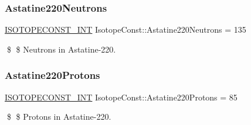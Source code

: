 \subsubsection{\texorpdfstring{Astatine220\+Neutrons}{Astatine220Neutrons}}
{\footnotesize\ttfamily \mbox{\hyperlink{group___isotope_const-_macros_ga5f18360b3e99483a35c32d789e62621c}{I\+S\+O\+T\+O\+P\+E\+C\+O\+N\+S\+T\+\_\+\+I\+NT}} Isotope\+Const\+::\+Astatine220\+Neutrons = 135}

\$ \$ Neutrons in Astatine-\/220. \mbox{\label{group___isotope_const-_astatine-_at220_gaec1e8ab21c4bf2a6cb58ed55bd0a7ad8}} 
\subsubsection{\texorpdfstring{Astatine220\+Protons}{Astatine220Protons}}
{\footnotesize\ttfamily \mbox{\hyperlink{group___isotope_const-_macros_ga5f18360b3e99483a35c32d789e62621c}{I\+S\+O\+T\+O\+P\+E\+C\+O\+N\+S\+T\+\_\+\+I\+NT}} Isotope\+Const\+::\+Astatine220\+Protons = 85}

\$ \$ Protons in Astatine-\/220. 